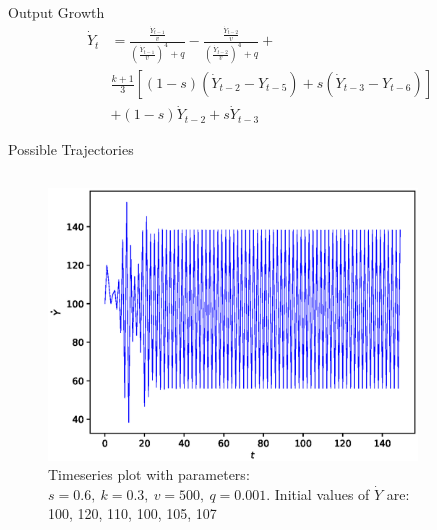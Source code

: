 \documentclass{beamer}
\begin{document}
\begin{frame}{Output Growth}
	\begin{equation*}
	\begin{split}
        \dot Y_{t}& = \frac{\frac{\dot Y_{t-1}}{v}}{\left(\frac{\dot Y_{t-1}}{v}\right)^4+q}-\frac{\frac{\dot Y_{t-2}}{v}}{\left(\frac{\dot Y_{t-2}}{v}\right)^4+q} + \\
		& \frac{k+1}{3}\left[(1-s)(\dot Y_{t-2}-Y_{t-5})+s(\dot Y_{t-3}-Y_{t-6})\right]\\
		& +(1-s)\dot Y_{t-2}+s\dot Y_{t-3}
	\end{split}
	\end{equation*}
\end{frame}

\begin{frame}{Possible Trajectories}
	\begin{columns}
	\begin{column}{0.5\textwidth}
		\begin{figure}
			\centering
			\includegraphics[width=1.0\textwidth]{timeseries1.eps}
			\caption{Timeseries plot with parameters: $s=0.6,\ k=0.3,\ v=500,\ q=0.001$. Initial values of $\dot Y$ are: 100, 120, 110, 100, 105, 107}
			\label{metzlerian_growth-timeseries1}
		\end{figure}
	\end{column}
	\begin{column}{0.5\textwidth}
		\begin{figure}
			\centering

\end{figure}
\end{column}
\end{columns}
\end{frame}
\end{document}
